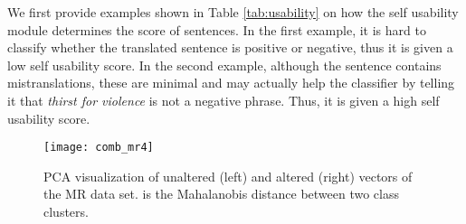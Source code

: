 \documentclass{article}
\begin{document}
We first provide examples shown in Table \ref{tab:usability} on how the self usability module determines the score of sentences. In the first example, it is hard to classify whether the translated sentence is positive or negative, thus it is given a low self usability score. In the second example, although the sentence contains mistranslations, these are minimal and may actually help the classifier by telling it that \textit{thirst for violence} is not a negative phrase. Thus, it is given a high self usability score.



\begin{figure}[!t]
    \centering
    \texttt{[image: comb\_mr4]}
\caption{PCA visualization of unaltered (left) and altered (right) vectors of the MR data set.  is the Mahalanobis distance between two class clusters.}
    \label{fig:mrvecsbefaf}
\end{figure}
\end{document}
